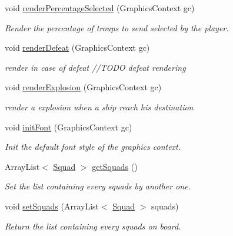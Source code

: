 \begin{DoxyCompactItemize}
void \hyperlink{classfr_1_1groupe40_1_1projet_1_1model_1_1board_1_1_galaxy_ab7d878b625cbb910e7eb20d0b3b3c260}{render\+Percentage\+Selected} (Graphics\+Context gc)
\begin{DoxyCompactList}\small\item\em Render the percentage of troups to send selected by the player. \end{DoxyCompactList}\item 
void \hyperlink{classfr_1_1groupe40_1_1projet_1_1model_1_1board_1_1_galaxy_aac749470d94e804f10e6891dbd043e03}{render\+Defeat} (Graphics\+Context gc)
\begin{DoxyCompactList}\small\item\em render in case of defeat //\+T\+O\+DO defeat rendering \end{DoxyCompactList}\item 
void \hyperlink{classfr_1_1groupe40_1_1projet_1_1model_1_1board_1_1_galaxy_aabdca1530440c8acec7f50c30af1a805}{render\+Explosion} (Graphics\+Context gc)
\begin{DoxyCompactList}\small\item\em render a explosion when a ship reach his destination \end{DoxyCompactList}\item 
void \hyperlink{classfr_1_1groupe40_1_1projet_1_1model_1_1board_1_1_galaxy_afcc91fd13d372426cae4eca41e115a11}{init\+Font} (Graphics\+Context gc)
\begin{DoxyCompactList}\small\item\em Init the default font style of the graphics context. \end{DoxyCompactList}\item 
Array\+List$<$ \hyperlink{classfr_1_1groupe40_1_1projet_1_1model_1_1ships_1_1_squad}{Squad} $>$ \hyperlink{classfr_1_1groupe40_1_1projet_1_1model_1_1board_1_1_galaxy_a76035e4de1484dfba7daf377127f80c0}{get\+Squads} ()
\begin{DoxyCompactList}\small\item\em Set the list containing every squads by another one. \end{DoxyCompactList}\item 
void \hyperlink{classfr_1_1groupe40_1_1projet_1_1model_1_1board_1_1_galaxy_a598d42d4b1e24f23d1e004a2e69c8959}{set\+Squads} (Array\+List$<$ \hyperlink{classfr_1_1groupe40_1_1projet_1_1model_1_1ships_1_1_squad}{Squad} $>$ squads)
\begin{DoxyCompactList}\small\item\em Return the list containing every squads on board. \end{DoxyCompactList}\item 

\end{DoxyCompactItemize}
